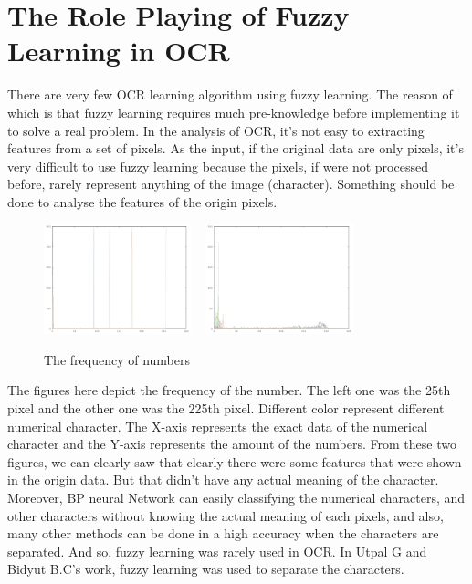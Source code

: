 \documentclass[12pt]{article} %
\begin{document}

\section{The Role Playing of Fuzzy Learning in OCR}
There are very few OCR learning algorithm using fuzzy learning. The reason of which is that fuzzy learning requires much pre-knowledge before implementing it to solve a real problem. In the analysis of OCR, it's not easy to extracting features from a set of pixels. As the input, if the original data are only pixels, it's very difficult to use fuzzy learning because the pixels, if were not processed before, rarely represent anything of the image (character). Something should be done to analyse the features of the origin pixels. \\
\begin{figure}[!htb]
    \begin{center}
        \includegraphics[width=0.38\textwidth]{25}
        \mbox{    }
        \includegraphics[width=0.38\textwidth]{225}
    \end{center}
    \caption{The frequency of numbers}
    \label{The frequency of numbers}
\end{figure}
The figures here depict the frequency of the number. The left one was the 25th pixel and the other one was the 225th pixel. Different color represent different numerical character. The X-axis represents the exact data of the numerical character and the Y-axis represents the amount of the numbers. From these two figures, we can clearly saw that clearly there were some features that were shown in the origin data. But that didn't have any actual meaning of the character. \\ 
Moreover, BP neural Network can easily classifying the numerical characters, and other characters without knowing the actual meaning of each pixels, and also, many other methods can be done in a high accuracy when the characters are separated. And so, fuzzy learning was rarely used in OCR. In Utpal G and Bidyut B.C's work, fuzzy learning was used to separate the characters. \\
\end{document}
